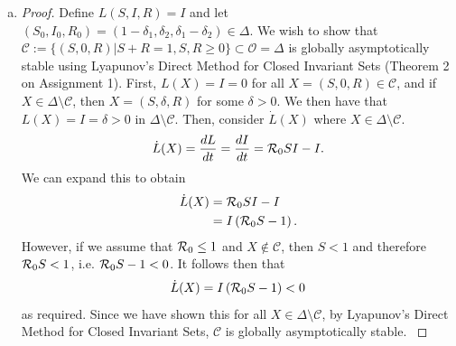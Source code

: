 \documentclass[12pt]{article}\usepackage[]{graphicx}\usepackage[]{color}
\begin{document}
\begin{enumerate}[(a)]
{\begin{proof}
{Next, we check the second condition in the theorem. Namely, we verify that $\dot{L}(S,I,R) <0$ for $\{ (S,I,R) \in \mathcal{O} \ | \ (S,I,R) \neq (1,0,0)\}$. We note that $\dot{L}(S,I,R) = dI/dt + dR/dt$. Thus, we wish to verify that $\R_0 SI - I + (1-\varepsilon) I - \varepsilon R <0$. Cancelling terms and using that $R=1-S-I$, we need to verify that $\R_0 SI - \varepsilon + \varepsilon S <0$. Now, if  $(S, I, R) \in \mathcal{O}$, then $I<\varepsilon(1-S)/\R_0S$, and 
$$
\dot L = \R_0 SI - \varepsilon + \varepsilon S < \R_0 S \frac{\varepsilon(1-S)}{\R_0 S}- \varepsilon + \varepsilon S = \varepsilon(1-S) - \varepsilon(1-S) = 0
$$
Thus, as the Lyapunov function $L(S,I,R)=I+R$ in the region $\mathcal{O}=\{(S,I,R) \in \Delta \ | \ I< \varepsilon(1-S)/\R_0S\}$ satisfies the conditions for asymptotic stability in Lyapunov's direct method, we have that the disease free equilibrium is locally asymptotically stable when $\R_0<1$.
}\end{proof}}

\item \SIRf
{\color{blue}\begin{proof}{\color{magenta}
Define $L(S, I, R) = I$ and let $(S_0, I_0, R_0) = (1- \delta_1, \delta_2, \delta_1 - \delta_2) \in \Delta$. We wish to show that $\mathcal{C} := \{(S, 0, R) | S+R = 1, S, R \geq 0\} \subset \mathcal{O} = \Delta$ is globally asymptotically stable using Lyapunov's Direct Method for Closed Invariant Sets (Theorem 2 on Assignment 1). 
First, $L(X) = I = 0$ for all $X = (S, 0, R) \in \mathcal{C}$, and if $X \in \Delta \setminus \mathcal{C}$, then $X = (S, \delta, R)$ for some $\delta >0$. We then have that $L(X) = I = \delta >0$ in $\Delta \setminus \mathcal{C}$. 
Then, consider $\dot{L}(X)$ where $X \in \Delta \setminus \mathcal{C}$.
\begin{equation}
\begin{aligned}
\dot L(X) = \frac{dL}{dt} = \frac{dI}{dt} = {\cal R}_0 S I - I.
\end{aligned}
\end{equation}
We can expand this to obtain 
\begin{equation}
\begin{aligned}
\dot L(X) &= {\cal R}_0 S I -  I \\
&= I \left( {\cal R}_0 S - 1 \right).
\end{aligned}
\end{equation}
However, if we assume that ${\cal R}_0 \leq 1$ and $X \not \in \mathcal{C}$, then $S < 1$ and therefore ${\cal R}_0 S <1$, i.e. ${\cal R}_0 S - 1 < 0$. It follows then that  
\begin{equation}
\begin{aligned}
\dot L(X) = I \left( {\cal R}_0 S - 1 \right) < 0
\end{aligned}
\end{equation}
as required. Since we have shown this for all $X \in \Delta \setminus \mathcal C$, by Lyapunov's Direct Method for Closed Invariant Sets, $\mathcal{C}$ is globally asymptotically stable.
}\end{proof}}


\end{enumerate}
\end{document}
